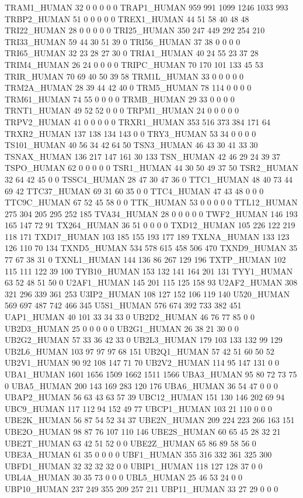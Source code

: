 TRAM1_HUMAN	32	0	0	0	0	0
TRAP1_HUMAN	959	991	1099	1246	1033	993
TRBP2_HUMAN	51	0	0	0	0	0
TREX1_HUMAN	44	51	58	40	48	48
TRI22_HUMAN	28	0	0	0	0	0
TRI25_HUMAN	350	247	449	292	254	210
TRI33_HUMAN	59	44	30	51	39	0
TRI56_HUMAN	37	38	0	0	0	0
TRI65_HUMAN	32	23	28	27	30	0
TRIA1_HUMAN	40	24	55	23	37	28
TRIM4_HUMAN	26	24	0	0	0	0
TRIPC_HUMAN	70	170	101	133	45	53
TRIR_HUMAN	70	69	40	50	39	58
TRM1L_HUMAN	33	0	0	0	0	0
TRM2A_HUMAN	28	39	44	42	40	0
TRM5_HUMAN	78	114	0	0	0	0
TRM61_HUMAN	74	55	0	0	0	0
TRMB_HUMAN	29	33	0	0	0	0
TRNT1_HUMAN	49	52	52	0	0	0
TRPM1_HUMAN	24	0	0	0	0	0
TRPV2_HUMAN	41	0	0	0	0	0
TRXR1_HUMAN	353	516	373	384	171	64
TRXR2_HUMAN	137	138	134	143	0	0
TRY3_HUMAN	53	34	0	0	0	0
TS101_HUMAN	40	56	34	42	64	50
TSN3_HUMAN	46	43	30	41	33	30
TSNAX_HUMAN	136	217	147	161	30	133
TSN_HUMAN	42	46	29	24	39	37
TSPO_HUMAN	62	0	0	0	0	0
TSR1_HUMAN	44	30	50	49	37	50
TSR2_HUMAN	32	64	42	45	0	0
TSSC4_HUMAN	28	47	30	47	36	0
TTC1_HUMAN	48	40	73	44	69	42
TTC37_HUMAN	69	31	60	35	0	0
TTC4_HUMAN	47	43	48	0	0	0
TTC9C_HUMAN	67	52	45	58	0	0
TTK_HUMAN	53	0	0	0	0	0
TTL12_HUMAN	275	304	205	295	252	185
TVA34_HUMAN	28	0	0	0	0	0
TWF2_HUMAN	146	193	165	147	72	91
TX264_HUMAN	36	51	0	0	0	0
TXD12_HUMAN	105	226	122	219	118	171
TXD17_HUMAN	103	185	155	193	177	189
TXLNA_HUMAN	133	123	126	110	70	134
TXND5_HUMAN	534	578	615	458	506	470
TXND9_HUMAN	35	77	67	38	31	0
TXNL1_HUMAN	144	136	86	267	129	196
TXTP_HUMAN	102	115	111	122	39	100
TYB10_HUMAN	153	132	141	164	201	131
TYY1_HUMAN	63	52	48	51	50	0
U2AF1_HUMAN	145	201	115	125	158	93
U2AF2_HUMAN	308	321	296	339	361	253
U3IP2_HUMAN	108	127	152	106	119	140
U520_HUMAN	569	697	487	742	466	345
U5S1_HUMAN	576	674	392	733	382	451
UAP1_HUMAN	40	101	33	34	33	0
UB2D2_HUMAN	46	76	77	85	0	0
UB2D3_HUMAN	25	0	0	0	0	0
UB2G1_HUMAN	26	38	21	30	0	0
UB2G2_HUMAN	57	33	36	42	33	0
UB2L3_HUMAN	179	103	133	132	99	129
UB2L6_HUMAN	103	97	97	97	68	151
UB2Q1_HUMAN	57	42	51	60	50	52
UB2V1_HUMAN	90	92	108	147	71	70
UB2V2_HUMAN	114	95	147	131	0	0
UBA1_HUMAN	1601	1656	1509	1662	1511	1566
UBA3_HUMAN	95	80	72	73	75	0
UBA5_HUMAN	200	143	169	283	120	176
UBA6_HUMAN	36	54	47	0	0	0
UBAP2_HUMAN	56	63	43	63	57	39
UBC12_HUMAN	151	130	146	202	69	94
UBC9_HUMAN	117	112	94	152	49	77
UBCP1_HUMAN	103	21	110	0	0	0
UBE2K_HUMAN	56	87	54	52	34	37
UBE2N_HUMAN	209	224	223	266	163	151
UBE2O_HUMAN	98	87	76	107	110	146
UBE2S_HUMAN	60	65	45	28	32	21
UBE2T_HUMAN	63	42	51	52	0	0
UBE2Z_HUMAN	65	86	89	58	56	0
UBE3A_HUMAN	61	35	0	0	0	0
UBF1_HUMAN	355	316	332	361	325	300
UBFD1_HUMAN	32	32	32	32	0	0
UBIP1_HUMAN	118	127	128	37	0	0
UBL4A_HUMAN	30	35	73	0	0	0
UBL5_HUMAN	25	46	53	24	0	0
UBP10_HUMAN	237	249	355	209	257	211
UBP11_HUMAN	33	27	29	0	0	0

